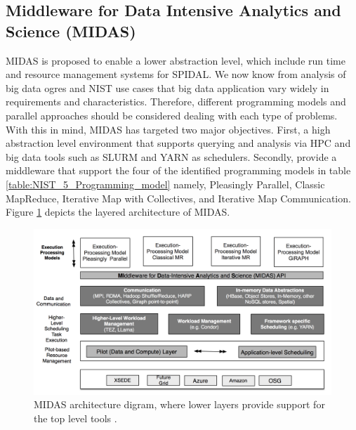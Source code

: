 \documentclass[runningheads,a4paper]{llncs}
\begin{document}
\subsection*{Middleware for Data Intensive Analytics and Science (MIDAS)}

MIDAS is proposed to enable a lower abstraction level, which include run time and resource management systems for SPIDAL. We now know from analysis of big data ogres and NIST use cases that big data application vary widely in requirements and characteristics. Therefore, different programming models and parallel approaches should be considered dealing with each type of problems. With this in mind, MIDAS has targeted two major objectives. First, a high abstraction level environment that supports querying and analysis via HPC and big data tools such as SLURM and YARN as schedulers. Secondly, provide a middleware that support the four of the identified programming models in table \ref{table:NIST_5_Programming_model} namely, Pleasingly Parallel, Classic MapReduce, Iterative Map with Collectives, and Iterative Map Communication. Figure \ref{fig:MIDAS_ARCH} depicts the layered architecture of MIDAS.

\begin{figure}[!htp]
	\includegraphics[scale=0.32]{./images/midas_architecture.png}
	\centering
	\caption{MIDAS architecture digram, where lower layers provide support for the top level tools \cite{qiu2014towards}.}
	\label{fig:MIDAS_ARCH}
\end{figure}
\end{document}
